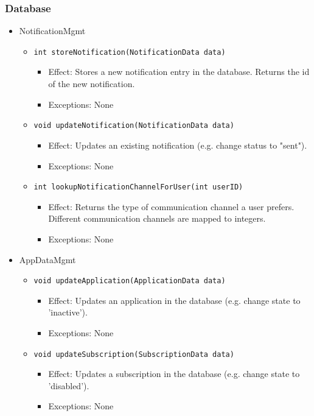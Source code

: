     \subsubsection{Database}
        \begin{itemize}
            \item NotificationMgmt
            \begin{itemize}
                \item \texttt{int storeNotification(NotificationData data)}
                \begin{itemize}
                    \item Effect: Stores a new notification entry in the database. Returns the id of the new notification.
                    \item Exceptions: None
                \end{itemize}
                \item \texttt{void updateNotification(NotificationData data)}
                \begin{itemize}
                    \item Effect: Updates an existing notification (e.g. change status to "sent").
                    \item Exceptions: None
                \end{itemize}
                \item \texttt{int lookupNotificationChannelForUser(int userID)}
                \begin{itemize}
                    \item Effect: Returns the type of communication channel a user prefers.
                                  Different communication channels are mapped to integers.
                    \item Exceptions: None
                \end{itemize}
            \end{itemize}

            \item AppDataMgmt
            \begin{itemize}
                \item \texttt{void updateApplication(ApplicationData data)}
                \begin{itemize}
                    \item Effect: Updates an application in the database (e.g. change state to 'inactive').
                    \item Exceptions: None
                \end{itemize}
                \item \texttt{void updateSubscription(SubscriptionData data)}
                \begin{itemize}
                    \item Effect: Updates a subscription in the database (e.g. change state to 'disabled').
                    \item Exceptions: None
                \end{itemize}
            \end{itemize}
        \end{itemize}

